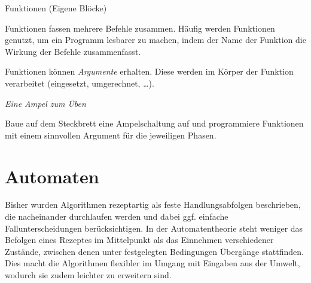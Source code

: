 \begin{zsfg}{Funktionen (Eigene Blöcke)}
	
	Funktionen fassen mehrere Befehle zusammen. Häufig werden Funktionen genutzt, um ein Programm lesbarer zu machen, indem der Name der Funktion die Wirkung der Befehle zusammenfasst.
	
	Funktionen können \emph{Argumente} erhalten. Diese werden im Körper der Funktion verarbeitet (eingesetzt, umgerechnet, \dots).
\end{zsfg}

\begin{aufgabe} \emph{Eine Ampel zum Üben}
	
	Baue auf dem Steckbrett eine Ampelschaltung auf und programmiere Funktionen mit einem sinnvollen Argument für die jeweiligen Phasen.
\end{aufgabe}

\newpage
\section{Automaten}





Bisher wurden Algorithmen rezeptartig als feste Handlungsabfolgen beschrieben, die nacheinander durchlaufen werden und dabei ggf. einfache Fallunterscheidungen berücksichtigen. In der Automatentheorie steht weniger das Befolgen eines Rezeptes im Mittelpunkt als das Einnehmen verschiedener Zustände, zwischen denen unter festgelegten Bedingungen Übergänge stattfinden. Dies macht die Algorithmen flexibler im Umgang mit Eingaben aus der Umwelt, wodurch sie zudem leichter zu erweitern sind.

